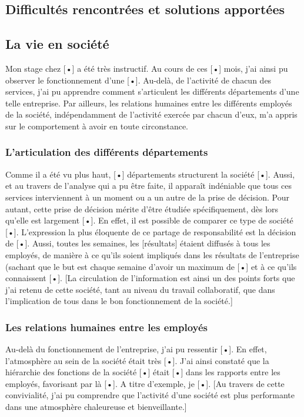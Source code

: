 \documentclass{article}
\begin{document}
		\subsection{Difficultés rencontrées et solutions apportées}
		\subsection{La vie en société}
		Mon stage chez [•] a été très instructif. Au cours de ces [•] mois, j’ai ainsi pu observer le fonctionnement 
		d’une [•]. Au-delà, de l’activité de chacun des services, j’ai pu apprendre comment s’articulent les différents 
		départements d’une telle entreprise. Par ailleurs, les relations humaines entre les différents employés de la 
		société, indépendamment de l’activité exercée par chacun d’eux, m’a appris sur le comportement à avoir en toute 
		circonstance.
			\subsubsection{L’articulation des différents départements}
			Comme il a été vu plus haut, [•] départements structurent la société [•]. Aussi, et au travers de l’analyse 
			qui a pu être faite, il apparaît indéniable que tous ces services interviennent à un moment ou a un autre de 
			la prise de décision. Pour autant, cette prise de décision mérite d’être étudiée spécifiquement, dès lors 
			qu’elle est largement [•]. En effet, il est possible de comparer ce type de société [•].
			L’expression la plus éloquente de ce partage de responsabilité est la décision de [•].
			Aussi, toutes les semaines, les [résultats]  étaient diffusés à tous les employés, de manière à ce qu’ils 
			soient impliqués dans les résultats de l’entreprise (sachant que le but est chaque semaine d’avoir un maximum 
			de [•] et à ce qu’ils connaissent [•].
			[La circulation de l’information est ainsi un des points forts que j’ai retenu de cette société, tant au 
			niveau du travail collaboratif, que dans l’implication de tous dans le bon fonctionnement de la société.]
			\subsubsection{Les relations humaines entre les employés}
			Au-delà du fonctionnement de l’entreprise, j’ai pu ressentir [•].
			En effet, l’atmosphère au sein de la société était très [•]. J’ai ainsi constaté que la hiérarchie des 
			fonctions de la société [•] était [•] dans les rapports entre les employés, favorisant par là [•].
			A titre d’exemple, je [•].
			[Au travers de cette convivialité, j’ai pu comprendre que l’activité d’une société est plus performante 
			dans une atmosphère chaleureuse et bienveillante.]
\newpage
{}
\end{document}
